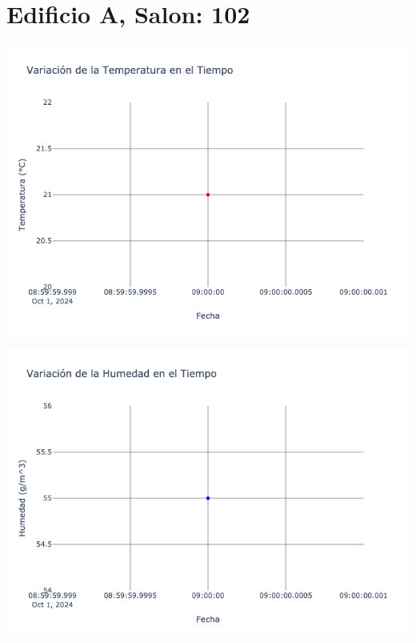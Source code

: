 \documentclass{article}
\begin{document}
    \section{Edificio A, Salon: 102}
    \noindent
    \begin{minipage}{0.48\textwidth}
        \centering
        \includegraphics[width=\textwidth]{../img/poli/TS102-90Dias-03-12-2024.png}
    \end{minipage}
    \hfill
    \begin{minipage}{0.48\textwidth}
        \centering
        \includegraphics[width=\textwidth]{../img/poli/HS102-90Dias-03-12-2024.png}
    \end{minipage}
\end{document}
